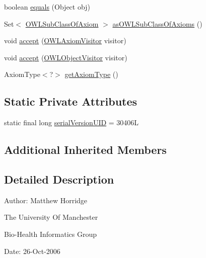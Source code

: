 \begin{DoxyCompactItemize}
boolean \hyperlink{classuk_1_1ac_1_1manchester_1_1cs_1_1owl_1_1owlapi_1_1_o_w_l_different_individuals_axiom_impl_ae8786ee3aa502932f6c5d00f68dd55b7}{equals} (Object obj)
\item 
Set$<$ \hyperlink{interfaceorg_1_1semanticweb_1_1owlapi_1_1model_1_1_o_w_l_sub_class_of_axiom}{O\-W\-L\-Sub\-Class\-Of\-Axiom} $>$ \hyperlink{classuk_1_1ac_1_1manchester_1_1cs_1_1owl_1_1owlapi_1_1_o_w_l_different_individuals_axiom_impl_aaa429665a06c1d748e68212f11def9a9}{as\-O\-W\-L\-Sub\-Class\-Of\-Axioms} ()
\item 
void \hyperlink{classuk_1_1ac_1_1manchester_1_1cs_1_1owl_1_1owlapi_1_1_o_w_l_different_individuals_axiom_impl_aab71b585985ed4720a838c9c6e3ec7a3}{accept} (\hyperlink{interfaceorg_1_1semanticweb_1_1owlapi_1_1model_1_1_o_w_l_axiom_visitor}{O\-W\-L\-Axiom\-Visitor} visitor)
\item 
void \hyperlink{classuk_1_1ac_1_1manchester_1_1cs_1_1owl_1_1owlapi_1_1_o_w_l_different_individuals_axiom_impl_a74ec5433a65865f0e2a3db0060ef862f}{accept} (\hyperlink{interfaceorg_1_1semanticweb_1_1owlapi_1_1model_1_1_o_w_l_object_visitor}{O\-W\-L\-Object\-Visitor} visitor)
\item 
Axiom\-Type$<$?$>$ \hyperlink{classuk_1_1ac_1_1manchester_1_1cs_1_1owl_1_1owlapi_1_1_o_w_l_different_individuals_axiom_impl_a5fa644b7e291da5c3b635bf77ab63cf8}{get\-Axiom\-Type} ()
\end{DoxyCompactItemize}
\subsection*{Static Private Attributes}
\begin{DoxyCompactItemize}
\item 
static final long \hyperlink{classuk_1_1ac_1_1manchester_1_1cs_1_1owl_1_1owlapi_1_1_o_w_l_different_individuals_axiom_impl_a455fc24fbe24135cdbb56aac6f3a13e4}{serial\-Version\-U\-I\-D} = 30406\-L
\end{DoxyCompactItemize}
\subsection*{Additional Inherited Members}


\subsection{Detailed Description}
Author\-: Matthew Horridge\par
 The University Of Manchester\par
 Bio-\/\-Health Informatics Group\par
 Date\-: 26-\/\-Oct-\/2006\par
\par
 

